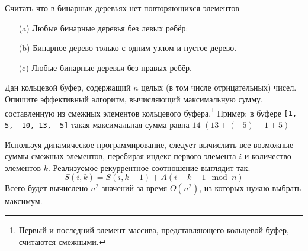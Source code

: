 \documentclass[12pt]{exam}
\begin{document}
\begin{questions}
\addpoints
Считать что в бинарных деревьях нет повторяющихся элементов

\begin{solution}[\fill]
    \begin{enumerate}
        \item[(a)] Любые бинарные деревья без левых ребёр:
        \begin{center}
        \end{center}
        \item[(b)] Бинарное дерево только с одним узлом и пустое дерево.
        \item[(c)] Любые бинарные деревья без правых ребёр.
    \end{enumerate}
\end{solution}


\question[7] Дан кольцевой буфер, содержащий $n$ целых (в том числе отрицательных) чисел. Опишите эффективный алгоритм, вычисляющий максимальную сумму, составленную из смежных элементов кольцевого буфера.\footnote{Первый и последний элемент массива, представляющего кольцевой буфер, считаются смежными.} Пример: в буфере {\tt [1, 5, -10, 13, -5]} такая максимальная сумма равна $14$ $(13 + (-5) + 1 + 5)$

\begin{solution}
Используя динамическое программирование, следует вычислить все возможные суммы смежных элементов, перебирая индекс первого элемента $i$ и количество элементов $k$. Реализуемое рекуррентное соотношение выглядит так:
$$
S(i, k) = S(i, k-1) + A(i+k-1 \mod n)
$$
Всего будет вычислено $n^2$ значений за время $O(n^2)$, из которых нужно выбрать максимум.

\newpage


\end{solution}
\end{questions}
\end{document}
